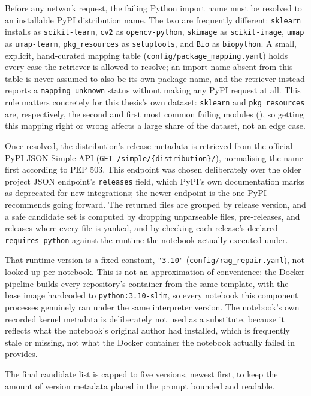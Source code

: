 Before any network request, the failing Python import name must be resolved
to an installable PyPI distribution name. The two are frequently different:
\texttt{sklearn} installs as \texttt{scikit-learn}, \texttt{cv2} as
\texttt{opencv-python}, \texttt{skimage} as \texttt{scikit-image},
\texttt{umap} as \texttt{umap-learn}, \texttt{pkg\_resources} as
\texttt{setuptools}, and \texttt{Bio} as \texttt{biopython}. A small,
explicit, hand-curated mapping table (\texttt{config/package\_mapping.yaml})
holds every case the retriever is allowed to resolve; an import name absent
from this table is never assumed to also be its own package name, and the
retriever instead reports a \texttt{mapping\_unknown} status without making
any PyPI request at all. This rule matters concretely for this thesis's own
dataset: \texttt{sklearn} and \texttt{pkg\_resources} are, respectively, the
second and first most common failing modules (), so
getting this mapping right or wrong affects a large share of the dataset,
not an edge case.

Once resolved, the distribution's release metadata is retrieved from the
official PyPI JSON Simple API
(\texttt{GET /simple/\{distribution\}/}), normalising the name first
according to PEP 503. This endpoint was chosen deliberately over the older
project JSON endpoint's \texttt{releases} field, which PyPI's own
documentation marks as deprecated for new integrations; the newer endpoint
is the one PyPI recommends going forward. The returned files are grouped by
release version, and a safe candidate set is computed by dropping
unparseable files, pre-releases, and releases where every file is yanked,
and by checking each release's declared \texttt{requires-python} against
the runtime the notebook actually executed under.

That runtime version is a fixed constant, \texttt{"3.10"}
(\texttt{config/rag\_repair.yaml}), not looked up per notebook. This is not
an approximation of convenience: the Docker pipeline builds every
repository's container from the same template, with the base image
hardcoded to \texttt{python:3.10-slim}, so every notebook this component
processes genuinely ran under the same interpreter version. The
notebook's own recorded kernel metadata is deliberately not used as a
substitute, because it reflects what the notebook's original author had
installed, which is frequently stale or missing, not what the Docker
container the notebook actually failed in provides.

The final candidate list is capped to five versions, newest first, to keep
the amount of version metadata placed in the prompt bounded and readable.


